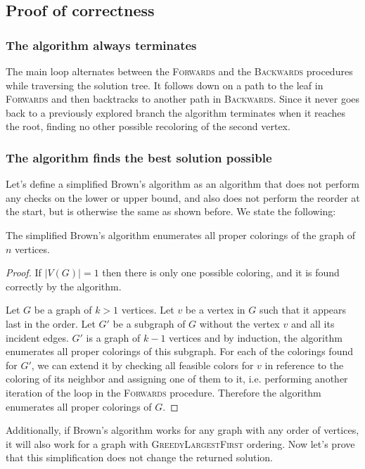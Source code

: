 \subsection{Proof of correctness}
\subsubsection{The algorithm always terminates}
The main loop alternates between the \textsc{Forwards} and the \textsc{Backwards} procedures while traversing the solution tree. It follows down on a path to the leaf in \textsc{Forwards} and then backtracks to another path in \textsc{Backwards}. Since it never goes back to a previously explored branch the algorithm terminates when it reaches the root, finding no other possible recoloring of the second vertex.
\subsubsection{The algorithm finds the best solution possible}
Let's define a simplified Brown's algorithm as an algorithm that does not perform any checks on the lower or upper bound, and also does not perform the reorder at the start, but is otherwise the same as shown before. We state the following:

\begin{theorem}[ ]
	The simplified Brown's algorithm enumerates all proper colorings of the graph of $n$ vertices.
\end{theorem}
\begin{proof}
    If $|V(G)| = 1$ then there is only one possible coloring, and it is found correctly by the algorithm.
    
    Let $G$ be a graph of $k > 1$ vertices. Let $v$ be a vertex in $G$ such that it appears last in the order. Let $G'$ be a subgraph of $G$ without the vertex $v$ and all its incident edges. $G'$ is a graph of $k-1$ vertices and by induction, the algorithm enumerates all proper colorings of this subgraph. For each of the colorings found for $G'$, we can extend it by checking all feasible colors for $v$ in reference to the coloring of its neighbor and assigning one of them to it, i.e. performing another iteration of the loop in the \textsc{Forwards} procedure. Therefore the algorithm enumerates all proper colorings of $G$.
\end{proof}

Additionally, if Brown's algorithm works for any graph with any order of vertices, it will also work for a graph with \textsc{GreedyLargestFirst} ordering. Now let's prove that this simplification does not change the returned solution. 

